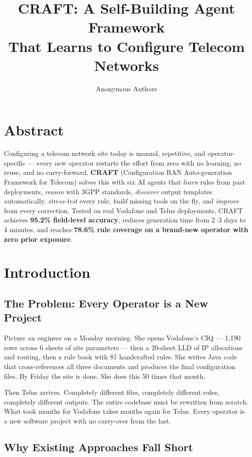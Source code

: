 \documentclass[10.5pt]{article}
\title{\textbf{\Large CRAFT: A Self-Building Agent Framework\\[4pt]
That Learns to Configure Telecom Networks}}
\author{Anonymous Authors}
\date{}
\begin{document}
\maketitle

\section*{Abstract}

Configuring a telecom network site today is manual, repetitive, and operator-specific --- every new operator restarts the effort from zero with no learning, no reuse, and no carry-forward. \textbf{CRAFT} (Configuration RAN Auto-generation Framework for Telecom) solves this with six AI agents that \emph{learn} rules from past deployments, \emph{reason} with 3GPP standards, \emph{discover} output templates automatically, \emph{stress-test} every rule, \emph{build} missing tools on the fly, and \emph{improve} from every correction. Tested on real Vodafone and Telus deployments, CRAFT achieves \textbf{95.2\% field-level accuracy}, reduces generation time from 2--3 days to 4 minutes, and reaches \textbf{78.6\% rule coverage on a brand-new operator with zero prior exposure}.

\section{Introduction}

\subsection*{The Problem: Every Operator is a New Project}

Picture an engineer on a Monday morning. She opens Vodafone's CIQ --- 1,190 rows across 6 sheets of site parameters --- then a 20-sheet LLD of IP allocations and routing, then a rule book with 81 handcrafted rules. She writes Java code that cross-references all three documents and produces the final configuration files. By Friday the site is done. She does this 50 times that month.

Then Telus arrives. Completely different files, completely different rules, completely different outputs. The entire codebase must be rewritten from scratch. What took months for Vodafone takes months again for Telus. Every operator is a new software project with no carry-over from the last.

\subsection*{Why Existing Approaches Fall Short}
\end{document}

